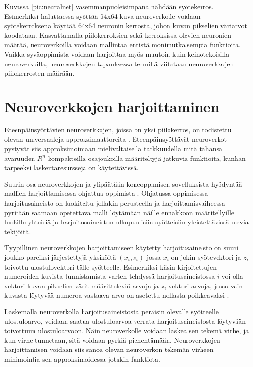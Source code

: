 \documentclass[finnish]{tktltiki2}
\theoremstyle{definition}
\theoremstyle{remark}
\begin{document}
  Kuvassa \ref{pic:neuralnet} vasemmanpuoleisimpana nähdään syötekerros. Esimerkiksi haluttaessa syöttää 64x64 kuva neuroverkolle voidaan syötekerroksena käyttää 64x64 neuronin kerrosta, johon kuvan pikselien väriarvot koodataan.
  Kasvattamalla piilokerroksien sekä kerroksissa olevien neuronien määrää, neuroverkoilla voidaan mallintaa entistä monimutkaisempia funktioita. Vaikka syväoppimista voidaan harjoittaa myös muutoin kuin keinotekoisilla neuroverkoilla, neuroverkkojen tapauksessa termillä viitataan neuroverkkojen piilokerrosten määrään. 

  \section{Neuroverkkojen harjoittaminen}
    \label{chap:neural-training}

  Eteenpäinsyöttävien neuroverkkojen, joissa on yksi piilokerros, on todistettu olevan universaaleja approksimaattoreita \cite{multilayer-feedforward-universal-approximators}. Eteenpäinsyöttävät neuroverkot pystyvät siis approksimoimaan mielivaltaisella tarkkuudella mitä tahansa avaruuden $R^n$ kompakteilla osajoukoilla määriteltyjä jatkuvia funktioita, kunhan tarpeeksi laskentaresursseja on käytettävissä.
  

  Suurin osa neuroverkkojen ja ylipäätään koneoppimisen sovelluksista hyödyntää mallien harjoittamisessa ohjattua oppimista \cite{nature-lecun15}. Ohjatussa oppimisessa harjoitusaineisto on luokiteltu jollakin perusteella ja harjoittamisvaiheessa pyritään saamaan opetettava malli löytämään näille ennakkoon määritellyille luokille yhteisiä ja harjoitusaineiston ulkopuolisiin syötteisiin yleistettävissä olevia tekijöitä. 
  
  Tyypillinen neuroverkkojen harjoittamiseen käytetty harjoitusaineisto on suuri joukko pareiksi järjestettyjä yksiköitä $ {(x_i, z_i)} $ jossa $x_i$ on jokin syötevektori ja $z_i$ toivottu ulostulovektori tälle syötteelle. Esimerkiksi käsin kirjoitettujen numeroiden kuvista tunnistamista varten tehdyssä harjoitusaineistossa $i$ voi olla vektori kuvan pikselien värit määritteleviä arvoja ja $z_i$ vektori arvoja, jossa vain kuvasta löytyvää numeroa vastaava arvo on asetettu nollasta poikkeavaksi \cite{Nielsen-neural}.

  Laskemalla neuroverkolla harjoitusaineistosta peräisin olevalle syötteelle ulostuloarvo, voidaan saatua ulostuloarvoa verrata harjoitusaineistosta löytyvään toivottuun ulostuloarvoon. Näin neuroverkolle voidaan laskea sen tekemä virhe, ja kun virhe tunnetaan, sitä voidaan pyrkiä pienentämään. 
  Neuroverkkojen harjoittamisen voidaan siis sanoa olevan neuroverkon tekemän virheen minimointia sen approksimoidessa jotakin funktiota.
  
\end{document}

